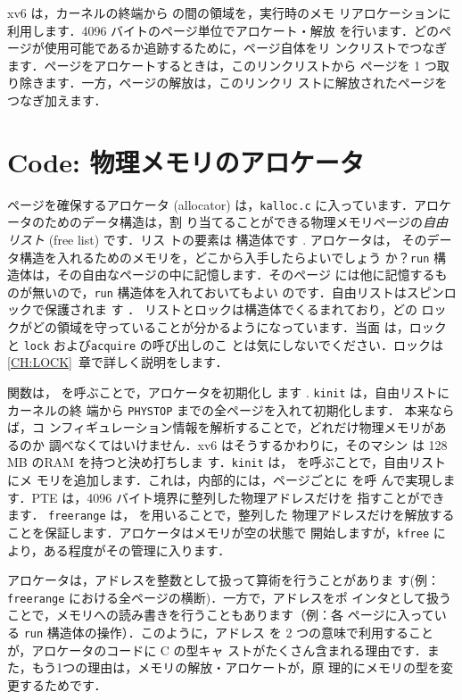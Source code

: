 xv6 は，カーネルの終端から  の間の領域を，実行時のメモ
リアロケーションに利用します．4096 バイトのページ単位でアロケート・解放
を行います．どのページが使用可能であるか追跡するために，ページ自体をリ
ンクリストでつなぎます．ページをアロケートするときは，このリンクリストから
ページを 1 つ取り除きます．一方，ページの解放は，このリンクリ
ストに解放されたページをつなぎ加えます．

\section{Code: 物理メモリのアロケータ}

ページを確保するアロケータ (allocator) は，\texttt{kalloc.c}
に入っています．アロケータのためのデータ構造は，割
り当てることができる物理メモリページの\textit{自由リスト} (free list) です．リス
トの要素は 構造体です . アロケータは，
そのデータ構造を入れるためのメモリを，どこから入手したらよいでしょう
か？\lstinline{run} 構造体は，その自由なページの中に記憶します．そのページ
には他に記憶するものが無いので，\lstinline{run} 構造体を入れておいてもよい
のです．自由リストはスピンロックで保護されま
す ．
リストとロックは構造体でくるまれており，どの
ロックがどの領域を守っていることが分かるようになっています．当面
は，ロックと \lstinline{lock} および\lstinline{acquire} の呼び出しのこ
とは気にしないでください．ロックは \ref{CH:LOCK}~章で詳しく説明をします．

 関数は， を呼ぶことで，アロケータを初期化し
ます . 
\lstinline{kinit} は，自由リストにカーネルの終
端から \lstinline{PHYSTOP} までの全ページを入れて初期化します．
本来ならば，コ
ンフィギュレーション情報を解析することで，どれだけ物理メモリがあるのか
調べなくてはいけません．xv6 はそうするかわりに，そのマシン
は 128 MB のRAM を持つと決め打ちしま
す．\lstinline{kinit} は， を呼ぶことで，自由リストにメ
モリを追加します．これは，内部的には，ページごとに  を呼
んで実現します．PTE は，4096 バイト境界に整列した物理アドレスだけを
指すことができます．
\lstinline{freerange} は， を用いることで，整列した
物理アドレスだけを解放することを保証します．アロケータはメモリが空の状態で
開始しますが，\lstinline{kfree} により，ある程度がその管理に入ります．

アロケータは，アドレスを整数として扱って算術を行うことがありま
す(例：\lstinline{freerange} における全ページの横断)．一方で，アドレスをポ
インタとして扱うことで，メモリへの読み書きを行うこともあります（例：各
ページに入っている \lstinline{run} 構造体の操作）．このように，アドレス
を 2 つの意味で利用することが，アロケータのコードに C の型キャ
ストがたくさん含まれる理由です．また，もう1つの理由は，メモリの解放・アロケートが，原
理的にメモリの型を変更するためです．

